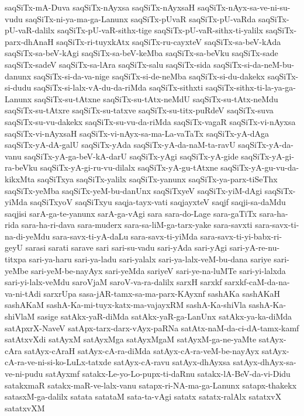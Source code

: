 {saqSiTx-mA-Duva
saqSiTx-nAyxsa
saqSiTx-nAyxsaH
saqSiTx-nAyx-sa-ve-ni-su-vudu
saqSiTx-ni-ya-ma-ga-Lanunx
saqSiTx-pUvaR
saqSiTx-pU-vaRda
saqSiTx-pU-vaR-dalilx
saqSiTx-pU-vaR-sithx-tige
saqSiTx-pU-vaR-sithx-ti-yalilx
saqSiTx-parx-dhAnaH
saqSiTx-ri-tuyxkAtx
saqSiTx-ru-cayxteV
saqSiTx-sa-beV-kAda
saqSiTx-sa-beV-kAgi
saqSiTx-sa-beV-keMba
saqSiTx-sa-beVku
saqSiTx-sade
saqSiTx-sadeV
saqSiTx-sa-lAra
saqSiTx-salu
saqSiTx-sida
saqSiTx-si-da-neM-bu-danunx
saqSiTx-si-da-va-nige
saqSiTx-si-de-neMba
saqSiTx-si-du-dakekx
saqSiTx-si-dudu
saqSiTx-si-lalx-vA-du-da-riMda
saqSiTx-sithxti
saqSiTx-sithx-ti-la-ya-ga-Lanunx
saqSiTx-su-tAtxne
saqSiTx-su-tAtx-neMdU
saqSiTx-su-tAtx-neMdu
saqSiTx-su-tAtxre
saqSiTx-su-tatxve
saqSiTx-su-titx-puRdeV
saqSiTx-suva
saqSiTx-su-vu-dakekx
saqSiTx-su-vu-da-riMda
saqSiTx-vagaR
saqSiTx-vi-nAyxsa
saqSiTx-vi-nAyxsaH
saqSiTx-vi-nAyx-sa-ma-La-vaTaTx
saqSiTx-yA-dAga
saqSiTx-yA-dA-galU
saqSiTx-yAda
saqSiTx-yA-da-naM-ta-ravU
saqSiTx-yA-da-vanu
saqSiTx-yA-ga-beV-kA-darU
saqSiTx-yAgi
saqSiTx-yA-gide
saqSiTx-yA-gi-ra-beVku
saqSiTx-yA-gi-ru-vu-dilalx
saqSiTx-yA-gu-tAtxne
saqSiTx-yA-gu-vu-da-kikxMta
saqSiTxya
saqSiTx-yalilx
saqSiTx-yanunx
saqSiTx-ya-parx-tiSeThx
saqSiTx-yeMba
saqSiTx-yeM-bu-danUnx
saqSiTxyeV
saqSiTx-yiM-dAgi
saqSiTx-yiMda
saqSiTxyoV
saqSiTxyu
saqja-tayx-vati
saqjayxteV
saqjf
saqji-sa-daMdu
saqjisi
sarA-ga-te-yanunx
sarA-ga-vAgi
sara
sara-do-Lage
sara-gaTiTx
sara-ha-rida
sara-ha-ri-dava
sara-muderx
sara-sa-liM-ga-tarx-yake
sara-savxti
sara-savx-ti-na-di-yeMdu
sara-savx-ti-yA-daLu
sara-savx-ti-yiMda
sara-savx-ti-yi-babx-ri-geyU
sarasi
sarati
sarave
sari
sari-su-vadu
sari-yAda
sari-yAgi
sari-yA-re-nu-titxpa
sari-ya-haru
sari-ya-ladu
sari-yalalx
sari-ya-lalx-veM-bu-dana
sariye
sari-yeMbe
sari-yeM-be-nayAyx
sari-yeMda
sariyeV
sari-ye-na-luMTe
sari-yi-lalxda
sari-yi-lalx-veMdu
saroVjaM
saroV-va-ra-dalilx
sarxH
sarxkf
sarxkf-caM-da-na-va-ni-tAdi
sarxrUpa
sasa-jAR-tamx-sa-ma-parx-KAyxnf
sashAKa
sashAKaH
sashAKaM
sashA-Ka-mi-tuyx-katx-ma-vajayxRM
sashA-Ka-shiVla
sashA-Ka-shiVlaM
sasige
satAkx-yaR-diMda
satAkx-yaR-ga-LanUnx
satAkx-ya-ka-diMda
satApxrX-NaveV
satApx-tarx-darx-vAyx-paRNa
satAtx-naM-da-ci-dA-tamx-kamf
satAtxvXdi
satAyxM
satAyxMga
satAyxMgaM
satAyxM-ga-ne-yaMte
satAyx-cAra
satAyx-cAraH
satAyx-cA-ra-diMda
satAyx-cA-ra-veM-be-nayAyx
satAyx-cA-ra-ve-ni-si-ko-LuLx-tatxde
satAyx-cA-ravu
satAyx-dhAyxsa
satAyx-dhAyx-sa-ve-ni-pudu
satAyxmf
satakx-Le-yo-Lo-pupx-ti-daRnu
satakx-lA-BeV-da-vi-Didu
satakxmaR
satakx-maR-ve-lalx-vanu
satapx-ri-NA-ma-ga-Lanunx
satapx-thakekx
satasxM-ga-dalilx
satata
satataM
sata-ta-vAgi
satatx
satatx-ralAlx
satatxvX
satatxvXM
}
